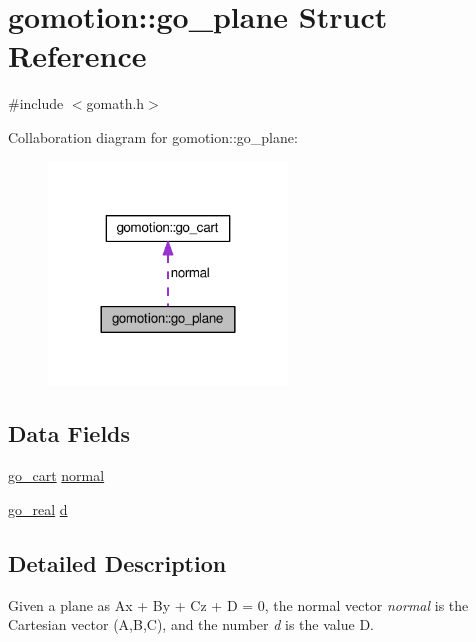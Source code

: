\hypertarget{structgomotion_1_1go__plane}{\section{gomotion\-:\-:go\-\_\-plane Struct Reference}
\label{structgomotion_1_1go__plane}
}


{\ttfamily \#include $<$gomath.\-h$>$}



Collaboration diagram for gomotion\-:\-:go\-\_\-plane\-:\nopagebreak
\begin{figure}[H]
\begin{center}
\leavevmode
\includegraphics[width=180pt]{df/d22/structgomotion_1_1go__plane__coll__graph}
\end{center}
\end{figure}
\subsection*{Data Fields}
\begin{DoxyCompactItemize}
\item 
\hyperlink{structgomotion_1_1go__cart}{go\-\_\-cart} \hyperlink{structgomotion_1_1go__plane_a94d5e5a023dc4f396e2a60b9d396c427}{normal}
\item 
\hyperlink{gotypes_8h_afd666a2393eebd71ee455846ac9def9b}{go\-\_\-real} \hyperlink{structgomotion_1_1go__plane_a6397e783bfdfab04419cf41b809bc9e7}{d}
\end{DoxyCompactItemize}


\subsection{Detailed Description}
Given a plane as Ax + By + Cz + D = 0, the normal vector {\itshape normal} is the Cartesian vector (A,B,C), and the number {\itshape d} is the value D.

